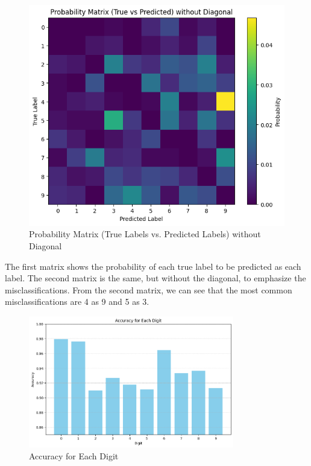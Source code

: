 \documentclass[a4paper, 12pt]{article}
\begin{document}
\begin{itemize}
\begin{figure}[H]
\begin{minipage}{0.45\textwidth}
                \includegraphics[width=\linewidth]{../figs/1-2-1--4.png}
                \caption{Probability Matrix (True Labels vs. Predicted Labels) without Diagonal}
                \label{fig:scenario2}
            \end{minipage}
        \end{figure}

        \smallskip
        The first matrix shows the probability of each true label to be predicted as each label.
        The second matrix is the same, but without the diagonal, to emphasize the misclassifications.
        From the second matrix, we can see that the most common misclassifications are 4 as 9 and 5 as 3.
            
        \begin{figure}[H]
            \centering
            \includegraphics[width=0.8\textwidth]{../figs/1-2-1--5.png}
            \caption{Accuracy for Each Digit}
            \label{fig:scenario1}
        \end{figure}

\end{itemize}
\end{document}
